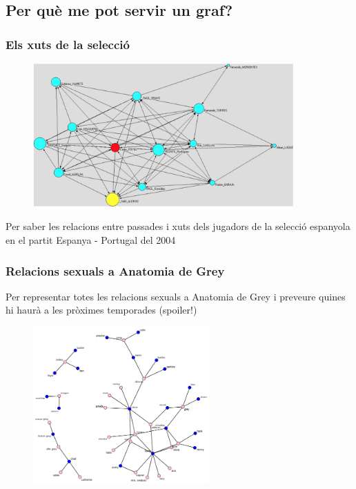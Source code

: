 \documentclass{beamer}
\begin{document}
\subsection{Per què me pot servir un graf?}

\begin{frame}
\frametitle{Els xuts de la selecció}
\begin{figure}[h]
 \label{fig:volum}
\centering
\includegraphics[height=5.5cm]{futbol1}
\end{figure}
Per saber les relacions entre passades i xuts dels jugadors de la selecció espanyola en el partit Espanya - Portugal del 2004
\end{frame}

\begin{frame}
\frametitle{Relacions sexuals a Anatomia de Grey}
Per representar totes les relacions sexuals a Anatomia de Grey i preveure quines hi haurà a les pròximes temporades (spoiler!)

\begin{figure}[h]
 \label{fig:volum}
\centering
\includegraphics[height=6cm]{grey1}
\end{figure}
\end{frame}
\end{document}
